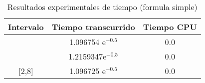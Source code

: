 \begin{table}[!ht]
\begin{center}
\begin{tabular}{|c||c||c|} \hline 
\textbf{Intervalo} & \textbf{Tiempo transcurrido}  & \textbf{Tiempo CPU}\\ \hline \hline
[-1,1] &  1.096754 $\text{e}^{-0.5}$& 0.0
\\
\hline
[-1,4] & 1.2159347$\text{e}^{-0.5}$ & 0.0
\\
\hline

[2,8] & 1.096725 $\text{e}^{-0.5}$& 0.0
\\
\hline
\hline

\end{tabular}
\end{center}
\caption{Resultados experimentales de tiempo (formula simple)}
\label{tab:3}
\end{table}
